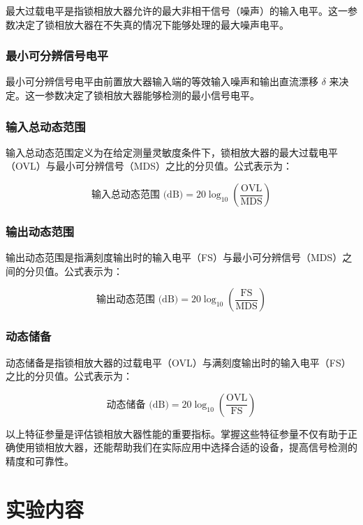 \documentclass[12pt,a4paper]{article}
\begin{document}
最大过载电平是指锁相放大器允许的最大非相干信号（噪声）的输入电平。这一参数决定了锁相放大器在不失真的情况下能够处理的最大噪声电平。

\subsubsection{最小可分辨信号电平}

最小可分辨信号电平由前置放大器输入端的等效输入噪声和输出直流漂移 $\delta$ 来决定。这一参数决定了锁相放大器能够检测的最小信号电平。

\subsubsection{输入总动态范围}

输入总动态范围定义为在给定测量灵敏度条件下，锁相放大器的最大过载电平（OVL）与最小可分辨信号（MDS）之比的分贝值。公式表示为：

\begin{equation}
\text{输入总动态范围 (dB)} = 20 \log_{10} \left( \frac{\text{OVL}}{\text{MDS}} \right)
\end{equation}

\subsubsection{输出动态范围}

输出动态范围是指满刻度输出时的输入电平（FS）与最小可分辨信号（MDS）之间的分贝值。公式表示为：

\begin{equation}
\text{输出动态范围 (dB)} = 20 \log_{10} \left( \frac{\text{FS}}{\text{MDS}} \right)
\end{equation}

\subsubsection{动态储备}

动态储备是指锁相放大器的过载电平（OVL）与满刻度输出时的输入电平（FS）之比的分贝值。公式表示为：

\begin{equation}
\text{动态储备 (dB)} = 20 \log_{10} \left( \frac{\text{OVL}}{\text{FS}} \right)
\end{equation}

以上特征参量是评估锁相放大器性能的重要指标。掌握这些特征参量不仅有助于正确使用锁相放大器，还能帮助我们在实际应用中选择合适的设备，提高信号检测的精度和可靠性。
\section{实验内容}
\end{document}
